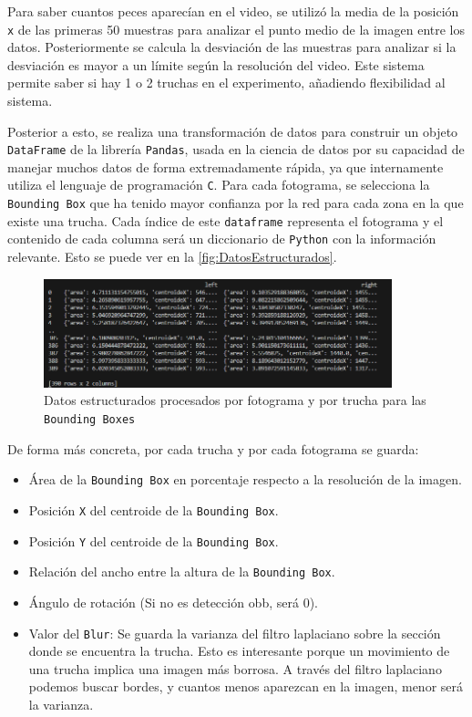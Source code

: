 Para saber cuantos peces aparecían en el video, se utilizó la media de la posición \texttt{x} de las primeras 50 muestras para analizar el punto medio de la imagen entre los datos. 
Posteriormente se calcula la desviación de las muestras para analizar si la desviación es mayor a un límite según la resolución del video. Este sistema permite saber si hay 1 o 2 truchas en el experimento, 
añadiendo flexibilidad al sistema.

Posterior a esto, se realiza una transformación de datos para construir un objeto \texttt{DataFrame} de la librería \texttt{Pandas}, usada en la ciencia de datos por su capacidad de manejar muchos datos de forma 
extremadamente rápida, ya que internamente utiliza el lenguaje de programación \texttt{C}. \newline
Para cada fotograma, se selecciona la \texttt{Bounding Box} que ha tenido mayor confianza por la red para cada zona en la que existe una trucha. Cada índice de este \texttt{dataframe} representa el fotograma y 
el contenido de cada columna será un diccionario de \texttt{Python} con la información relevante. Esto se puede ver en la \autoref{fig:DatosEstructurados}.
\begin{figure}[H]
    \centering
    \includegraphics[width=0.9\textwidth]{images/6/6.3/DatosEstructurados.png}
    \caption{Datos estructurados procesados por fotograma y por trucha para las \texttt{Bounding Boxes}}
    \label{fig:DatosEstructurados}
\end{figure}

\clearpage

De forma más concreta, por cada trucha y por cada fotograma se guarda:
\begin{itemize}
    \item Área de la \texttt{Bounding Box} en porcentaje respecto a la resolución de la imagen.
    \item Posición \texttt{X} del centroide de la \texttt{Bounding Box}.
    \item Posición \texttt{Y} del centroide de la \texttt{Bounding Box}.
    \item Relación del ancho entre la altura de la \texttt{Bounding Box}.
    \item Ángulo de rotación (Si no es detección \acrshort{obb}, será 0).
    \item Valor del \texttt{Blur}: Se guarda la varianza del filtro laplaciano sobre la sección donde se encuentra la trucha. Esto es interesante porque un movimiento de una trucha implica una imagen más borrosa. A través 
    del filtro laplaciano podemos buscar bordes, y cuantos menos aparezcan en la imagen, menor será la varianza.
\end{itemize}

